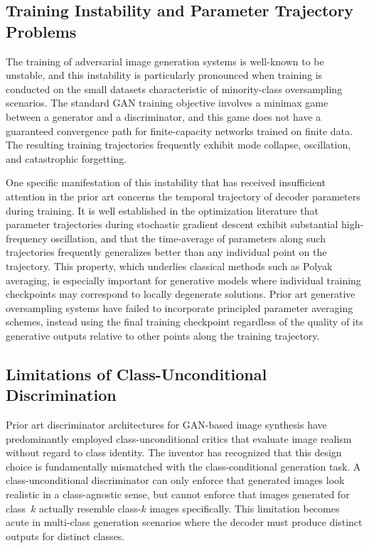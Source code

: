 \documentclass[12pt,letterpaper]{article}
\begin{document}
\subsection{Training Instability and Parameter Trajectory Problems}

The training of adversarial image generation systems is well-known to be
unstable, and this instability is particularly pronounced when training is
conducted on the small datasets characteristic of minority-class oversampling
scenarios.  The standard GAN training objective involves a minimax game
between a generator and a discriminator, and this game does not have a
guaranteed convergence path for finite-capacity networks trained on finite
data.  The resulting training trajectories frequently exhibit mode collapse,
oscillation, and catastrophic forgetting.

One specific manifestation of this instability that has received insufficient
attention in the prior art concerns the temporal trajectory of decoder
parameters during training.  It is well established in the optimization
literature that parameter trajectories during stochastic gradient descent
exhibit substantial high-frequency oscillation, and that the time-average of
parameters along such trajectories frequently generalizes better than any
individual point on the trajectory.  This property, which underlies classical
methods such as Polyak averaging, is especially important for generative
models where individual training checkpoints may correspond to locally
degenerate solutions.  Prior art generative oversampling systems have failed
to incorporate principled parameter averaging schemes, instead using the final
training checkpoint regardless of the quality of its generative outputs
relative to other points along the training trajectory.

\subsection{Limitations of Class-Unconditional Discrimination}

Prior art discriminator architectures for GAN-based image synthesis have
predominantly employed class-unconditional critics that evaluate image
realism without regard to class identity.  The inventor has recognized that
this design choice is fundamentally mismatched with the class-conditional
generation task.  A class-unconditional discriminator can only enforce that
generated images look realistic in a class-agnostic sense, but cannot
enforce that images generated for class~$k$ actually resemble class-$k$
images specifically.  This limitation becomes acute in multi-class generation
scenarios where the decoder must produce distinct outputs for distinct
classes.
\end{document}
